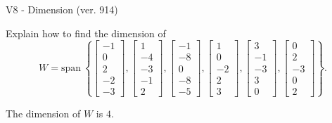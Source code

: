 \begin{exercise}
  \begin{exerciseTitle}V8 - Dimension (ver. 914)\end{exerciseTitle}
  \begin{exerciseStatement}
    Explain how to find the dimension of 
\[W=\mathrm{span}\ \left\{\left[\begin{array}{r}
-1 \\
0 \\
2 \\
-2 \\
-3
\end{array}\right] , \left[\begin{array}{r}
1 \\
-4 \\
-3 \\
-1 \\
2
\end{array}\right] , \left[\begin{array}{r}
-1 \\
-8 \\
0 \\
-8 \\
-5
\end{array}\right] , \left[\begin{array}{r}
1 \\
0 \\
-2 \\
2 \\
3
\end{array}\right] , \left[\begin{array}{r}
3 \\
-1 \\
-3 \\
3 \\
0
\end{array}\right] , \left[\begin{array}{r}
0 \\
2 \\
-3 \\
0 \\
2
\end{array}\right]\right\}.\]



  \end{exerciseStatement}
  \begin{exerciseAnswer}
   The dimension of \(W\) is  \(4\).
  


  \end{exerciseAnswer}
\end{exercise}